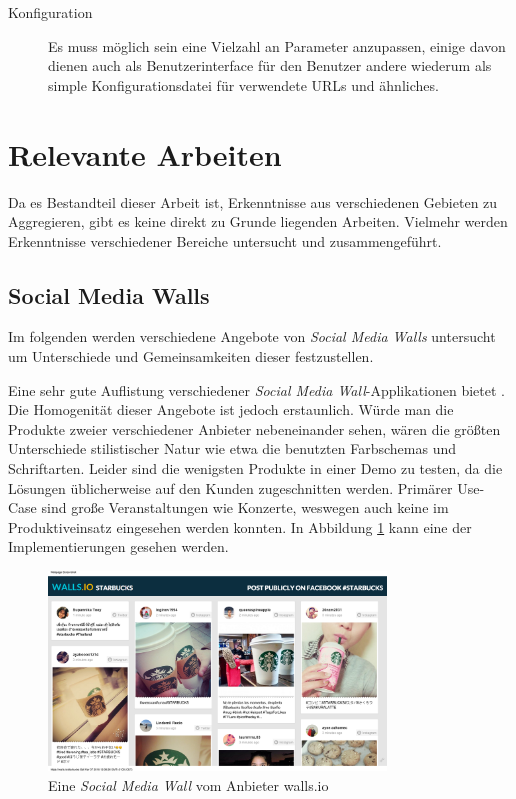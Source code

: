 \documentclass[12pt,twoside]{book}
\begin{document}
\begin{description}
\item[Konfiguration]
  Es muss möglich sein eine Vielzahl an Parameter anzupassen, einige davon dienen auch als Benutzerinterface für den Benutzer andere wiederum als simple Konfigurationsdatei für verwendete URLs und ähnliches.

\end{description}

\section{Relevante Arbeiten}

Da es Bestandteil dieser Arbeit ist, Erkenntnisse aus verschiedenen Gebieten zu Aggregieren, gibt es keine direkt zu Grunde liegenden Arbeiten. Vielmehr werden Erkenntnisse verschiedener Bereiche untersucht und zusammengeführt.

\subsection{Social Media Walls}

Im folgenden werden verschiedene Angebote von \textit{Social Media Walls} untersucht um Unterschiede und Gemeinsamkeiten dieser festzustellen.

Eine sehr gute Auflistung verschiedener \textit{Social Media Wall}-Applikationen bietet \citep{hofram}. Die Homogenität dieser Angebote ist jedoch erstaunlich. Würde man die Produkte zweier verschiedener Anbieter nebeneinander sehen, wären die größten Unterschiede stilistischer Natur wie etwa die benutzten Farbschemas und Schriftarten. Leider sind die wenigsten Produkte in einer Demo zu testen, da die Lösungen üblicherweise auf den Kunden zugeschnitten werden. Primärer Use-Case sind große Veranstaltungen wie Konzerte, weswegen auch keine im Produktiveinsatz eingesehen werden konnten. In Abbildung \ref{fig:socialwall} kann eine der Implementierungen gesehen werden.\\

\begin{figure}[htbp]
    \centering
    \includegraphics[width=0.8\textwidth]{images/Starbucks.png}
    \caption{Eine \textit{Social Media Wall} vom Anbieter walls.io \cite{wallsio}}\label{fig:socialwall}
\end{figure}
\end{document}
